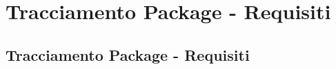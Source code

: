 \section{Tracciamento Package - Requisiti}
\subsection{Tracciamento Package - Requisiti}
\normalsize
%
%

\newpage
